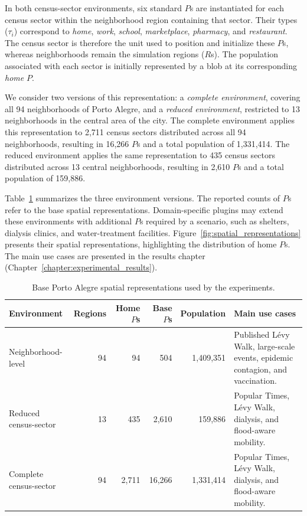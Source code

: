In both census-sector environments, six standard $P$s are instantiated for each census sector within the neighborhood region containing that sector. Their types ($\tau_i$) correspond to \textit{home}, \textit{work}, \textit{school}, \textit{marketplace}, \textit{pharmacy}, and \textit{restaurant}. The census sector is therefore the unit used to position and initialize these $P$s, whereas neighborhoods remain the simulation regions ($R$s). The population associated with each sector is initially represented by a blob at its corresponding \textit{home} $P$.

We consider two versions of this representation: a \textit{complete environment}, covering all 94 neighborhoods of Porto Alegre, and a \textit{reduced environment}, restricted to 13 neighborhoods in the central area of the city.
The complete environment applies this representation to 2,711 census sectors distributed across all 94 neighborhoods, resulting in 16,266 $P$s and a total population of 1,331,414. The reduced environment applies the same representation to 435 census sectors distributed across 13 central neighborhoods, resulting in 2,610 $P$s and a total population of 159,886.


Table~\ref{tbl:shared_simulation_environments} summarizes the three environment versions. The reported counts of $P$s refer to the base spatial representations. Domain-specific plugins may extend these environments with additional $P$s required by a scenario, such as shelters, dialysis clinics, and water-treatment facilities.
Figure~\ref{fig:spatial_representations} presents their spatial representations, highlighting the distribution of home $P$s. 
The main use cases are presented in the results chapter (Chapter~\ref{chapter:experimental_results}).

\begin{table}[ht]
\centering
\footnotesize
\setlength{\tabcolsep}{4pt}
\caption{Base Porto Alegre spatial representations used by the experiments.}
\label{tbl:shared_simulation_environments}
\begin{tabularx}{\linewidth}{@{}p{2.6cm}rrrrX@{}}
\toprule
\textbf{Environment} &
\textbf{Regions} &
\textbf{Home $P$s} &
\textbf{Base $P$s} &
\textbf{Population} &
\textbf{Main use cases} \\
\midrule
Neighborhood-level
    & 94 & 94 & 504 & 1,409,351
    & Published L\'evy Walk, large-scale events, epidemic contagion, and vaccination. \\
Reduced census-sector
    & 13 & 435 & 2,610
    & 159,886
    & Popular Times, L\'evy Walk, dialysis, and flood-aware mobility. \\
Complete census-sector 
    & 94 & 2,711 & 16,266
    & 1,331,414
    & Popular Times, L\'evy Walk, dialysis, and flood-aware mobility. \\
\bottomrule
\end{tabularx}
\end{table}

